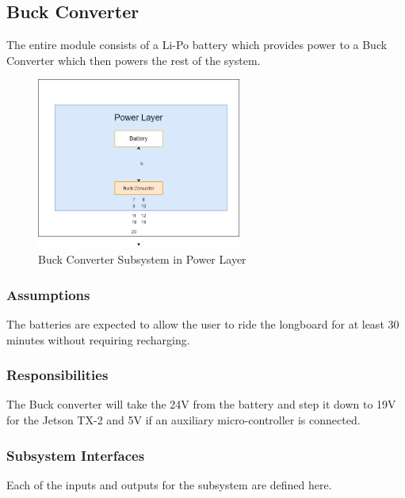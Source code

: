 \subsection{Buck Converter}
The entire module consists of a Li-Po battery which provides power to a Buck Converter which then powers the rest of the system.

\begin{figure}[h!]
	\centering
 	\includegraphics[width=0.60\textwidth]{images/Buck.png}
 \caption{Buck Converter Subsystem in Power Layer}
\end{figure}

\subsubsection{Assumptions}
The batteries are expected to allow the user to ride the longboard for at least 30 minutes without requiring recharging.

\subsubsection{Responsibilities}
The Buck converter will take the 24V from the battery and step it down to 19V for the Jetson TX-2 and 5V if an auxiliary micro-controller is connected.

\subsubsection{Subsystem Interfaces}
Each of the inputs and outputs for the subsystem are defined here.

